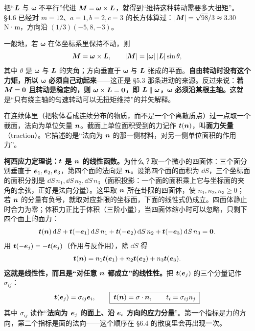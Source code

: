 \documentclass[11pt]{ctexart}
\newcommand{\ten}[1]{\mathbf{#1}}
\let\orighdr\hdr
\renewcommand{\hdr}[2]{\par\needspace{10\baselineskip}\orighdr{#1}{#2}}
\let\origsubhdr\subhdr
\renewcommand{\subhdr}[1]{\par\needspace{3\baselineskip}\origsubhdr{#1}}
\begin{document}
把“$\boldsymbol{L}$ 与 $\boldsymbol\omega$ 不平行”代进 $\boldsymbol{M}=\boldsymbol\omega\times\boldsymbol{L}$，就得到“维持这种转动需要多大扭矩”。\S4.6 已经对 $m=12$、$a=1,b=2,c=3$ 的长方体算过：$|\boldsymbol{M}|=\sqrt{98}/3\approx3.30$ N·m，方向沿 $(1/3)(-5,8,-3)$。

一般地，若 $\boldsymbol\omega$ 在体坐标系里保持不动，则
\[
\boldsymbol{M}=\boldsymbol\omega\times\boldsymbol{L},\qquad
|\boldsymbol{M}|=|\boldsymbol\omega|\,|\boldsymbol{L}|\sin\theta,
\]
其中 $\theta$ 是 $\boldsymbol\omega$ 与 $\boldsymbol{L}$ 的夹角；方向垂直于 $\boldsymbol\omega$ 与 $\boldsymbol{L}$ 张成的平面。\textbf{自由转动时没有这个力矩，所以 $\boldsymbol\omega$ 必须自己动起来}——这正是 \S5.3 那条进动的来源。反过来说：\textbf{若 $\boldsymbol{M}=\boldsymbol{0}$ 且转动是稳定的，则 $\boldsymbol\omega\times\boldsymbol{L}=\boldsymbol{0}$，即 $\boldsymbol{L}\parallel\boldsymbol\omega$，$\boldsymbol\omega$ 必须沿某根主轴。}这就是“只有绕主轴的匀速转动可以无扭矩维持”的并矢解释。

\label{sec:stress}

\label{subsec:cauchy}

在连续体里（把物体看成连续分布的物质，而不是一个个离散质点）过一点取一个截面，法向为单位矢量 $\boldsymbol{n}$。截面上单位面积受到的力记作 $\boldsymbol{t}(\boldsymbol{n})$，叫\textbf{面力矢量}（traction）。它描述的是“法向为 $\boldsymbol{n}$ 的那一侧材料，对另一侧单位面积的作用力”。

\textbf{柯西应力定理说：$\boldsymbol{t}$ 是 $\boldsymbol{n}$ 的线性函数。}为什么？取一个微小的四面体：三个面分别垂直于 $\boldsymbol{e}_1,\boldsymbol{e}_2,\boldsymbol{e}_3$，第四个面的法向是 $\boldsymbol{n}$。设第四个面的面积为 $\dd S$，三个坐标面的面积分别是 $\dd S\,n_1,\dd S\,n_2,\dd S\,n_3$（面积投影：一个面的面积乘上它与坐标面的夹角的余弦，正好是法向分量）。这里取 $\boldsymbol{n}$ 所在卦限的四面体，使 $n_1,n_2,n_3\ge0$；若 $\boldsymbol{n}$ 的分量有负号，就取对应卦限的坐标面，下面的线性式仍成立。四面体静止时合力为零；体积力正比于体积（三阶小量），当四面体缩小时可以忽略，只剩下四个面上的面力：
\[
\boldsymbol{t}(\boldsymbol{n})\,\mathrm{d} S+\boldsymbol{t}(-\boldsymbol{e}_1)\,\mathrm{d} S\,n_1+\boldsymbol{t}(-\boldsymbol{e}_2)\,\mathrm{d} S\,n_2+\boldsymbol{t}(-\boldsymbol{e}_3)\,\mathrm{d} S\,n_3=\boldsymbol{0} .
\]
用 $\boldsymbol{t}(-\boldsymbol{e}_j)=-\boldsymbol{t}(\boldsymbol{e}_j)$（作用与反作用），除 $\dd S$ 得
\[
\boldsymbol{t}(\boldsymbol{n})=n_1\boldsymbol{t}(\boldsymbol{e}_1)+n_2\boldsymbol{t}(\boldsymbol{e}_2)+n_3\boldsymbol{t}(\boldsymbol{e}_3).
\]
\textbf{这就是线性性，而且是“对任意 $\boldsymbol{n}$ 都成立”的线性性。}把 $\boldsymbol{t}(\boldsymbol{e}_j)$ 的三个分量记作 $\sigma_{ij}$：
\[
\vect t(\vect e_j)=\sigma_{ij}\vect e_i,
\qquad
\boxed{\;\vect t(\vect n)=\ten\sigma\cdot\vect n,\qquad t_i=\sigma_{ij}n_j\;}
\]
其中 $\sigma_{ij}$ 读作“\textbf{法向为 $\boldsymbol{e}_j$ 的面上、沿 $\boldsymbol{e}_i$ 方向的应力分量}”。第一个指标是力的方向，第二个指标是面的法向——这个顺序在 \S6.4 的散度里会再出现一次。
\end{document}
